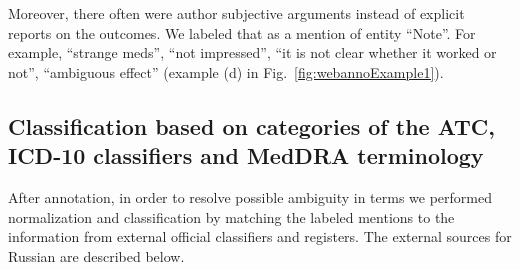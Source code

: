 \documentclass[a4paper,fleqn,longmktitle]{cas-dc}
\begin{document}
Moreover, there often were author subjective arguments instead of explicit reports on the outcomes. We labeled that as a mention of entity ``Note''. For example, ``strange meds'', ``not impressed'', ``it is not clear whether it worked or not'', ``ambiguous effect'' (example (d) in Fig.~\ref{fig:webannoExample1}). 


\subsection{Classification based on categories of the ATC, ICD-10 classifiers and MedDRA terminology}
    \label{subsec:Normalization}
After annotation, in order to resolve possible ambiguity in terms we performed normalization and classification by matching the labeled mentions to the information from external official classifiers and registers. The external sources for Russian are described below.
\end{document}

